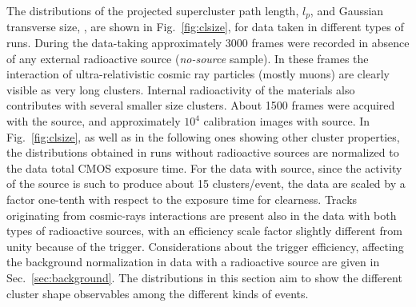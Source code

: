 The distributions of the projected supercluster path length, $l_p$,
and Gaussian transverse size, \tsigmag, are shown in
Fig.~\ref{fig:clsize}, for data taken in different types of runs.
During the data-taking approximately 3000 frames were recorded in
absence of any external radioactive source ({\it no-source}
sample). In these frames the interaction of ultra-relativistic cosmic
ray particles (mostly muons) are clearly visible as very long
clusters. Internal radioactivity of the \lemon materials also
contributes with several smaller size clusters. About 1500 frames were
acquired with the \ambe source, and approximately $10^4$ calibration
images with \fe source. In Fig.~\ref{fig:clsize}, as well as in the
following ones showing other cluster properties, the distributions
obtained in runs without radioactive sources are normalized to
the \ambe data total CMOS exposure time. For the data with \fe source,
since the activity of the source is such to produce about 15
clusters/event, the data are scaled by a factor one-tenth with respect
to the \ambe exposure time for clearness. Tracks originating from
cosmic-rays interactions are present also in the data with both types
of radioactive sources, with an efficiency scale factor slightly
different from unity because of the trigger. Considerations about the
trigger efficiency, affecting the background normalization in data
with a radioactive source are given in Sec.~\ref{sec:background}. The
distributions in this section aim to show the different cluster shape
observables among the different kinds of events.

